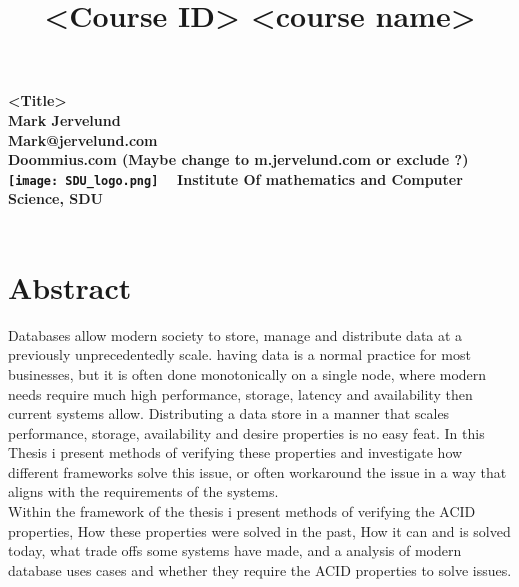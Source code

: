 \documentclass[a4paper,10pt,titlepage]{report}
\date{}
\title{<Course ID> <course name>}
\begin{document}
\begin{titlepage}
\centering
    \vspace*{9\baselineskip}
    \huge
    \bfseries
    <Title> \\
    \normalfont
    Mark Jervelund \\
    Mark@jervelund.com \\
    Doommius.com (Maybe change to m.jervelund.com or exclude ?) 	\\
    \vspace*{9\baselineskip}
    \normalfont
	\texttt{[image: SDU\_logo.png]}
    \vfill\
    \vspace{5mm}
    Institute Of mathematics and Computer Science, SDU \\

    \textbf{\datedate} \\[2\baselineskip]
\end{titlepage}

\renewcommand{\thepage}{\roman{page}}%
\tableofcontents
\newpage
\setcounter{page}{1}
\renewcommand{\thepage}{\arabic{page}}


\renewcommand*{\chapterpagestyle}{preamble}


  \section*{Abstract}

Databases allow modern society to store, manage and distribute data at a previously unprecedentedly scale. having data is a normal practice for most businesses, but it is often done monotonically on a single node, where modern needs require much high performance, storage, latency and  availability then current systems allow. Distributing a data store in a manner that scales performance, storage, availability and desire properties is no easy feat. In this Thesis i present methods of verifying these properties and investigate how different frameworks solve this issue, or often workaround the issue in a way that aligns with the requirements of the systems. \\

Within the framework of the thesis i present methods of verifying the ACID properties, How these properties were solved in the past, How it can and is solved today, what trade offs some systems have made, and a analysis of modern database uses cases and whether they require the ACID properties to solve issues.\\
\end{document}
